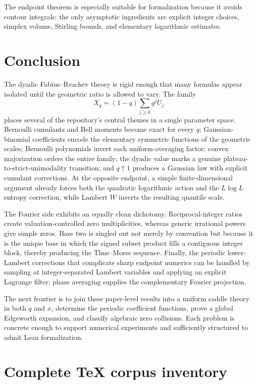 \documentclass[11pt,oneside]{article}
\theoremstyle{definition}
\theoremstyle{remark}
\begin{document}
The endpoint theorem is especially suitable for formalization because it avoids contour
integrals: the only asymptotic ingredients are explicit integer choices, simplex volume,
Stirling bounds, and elementary logarithmic estimates.

\section{Conclusion}
\label{sec:conclusion}

The dyadic Fabius--Rvachev theory is rigid enough that many formulas appear isolated until the
geometric ratio is allowed to vary.  The family
\[
 X_q=(1-q)\sum_{j\ge0}q^jU_j
\]
places several of the repository's central themes in a single parameter space.
Bernoulli cumulants and Bell moments become exact for every $q$; Gaussian-binomial
coefficients encode the elementary symmetric functions of the geometric scales; Bernoulli
polynomials invert each uniform-averaging factor; convex majorization orders the entire
family; the dyadic value marks a genuine plateau-to-strict-unimodality transition; and
$q\uparrow1$ produces a Gaussian law with explicit cumulant corrections.  At the opposite
endpoint, a simple finite-dimensional argument already forces both the quadratic logarithmic
action and the $L\log L$ entropy correction, while Lambert $W$ inverts the resulting quantile
scale.

The Fourier side exhibits an equally clean dichotomy.  Reciprocal-integer ratios create
valuation-controlled zero multiplicities, whereas generic irrational powers give simple
zeros.  Base two is singled out not merely by convention but because it is the unique base in
which the signed subset product fills a contiguous integer block, thereby producing the
Thue--Morse sequence.  Finally, the periodic lower-Lambert corrections that complicate sharp
endpoint numerics can be handled by sampling at integer-separated Lambert variables and
applying an explicit Lagrange filter; phase averaging supplies the complementary Fourier
projection.

The next frontier is to join these paper-level results into a uniform saddle theory in both
$q$ and $x$, determine the periodic coefficient functions, prove a global Edgeworth expansion,
and classify algebraic zero collisions.  Each problem is concrete enough to support numerical
experiments and sufficiently structured to admit Lean formalization.

\appendix

\section{Complete TeX corpus inventory}
\label{app:inventory}
\end{document}
